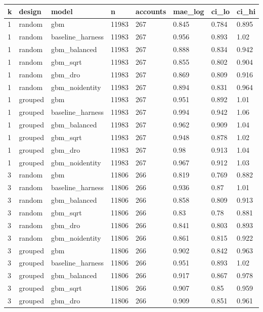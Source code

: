 \begin{tabular}{llllllll}
\toprule
k & design & model & n & accounts & mae\_log & ci\_lo & ci\_hi \\
\midrule
1 & random & gbm & 11983 & 267 & 0.845 & 0.784 & 0.895 \\
1 & random & baseline\_harness & 11983 & 267 & 0.956 & 0.893 & 1.02 \\
1 & random & gbm\_balanced & 11983 & 267 & 0.888 & 0.834 & 0.942 \\
1 & random & gbm\_sqrt & 11983 & 267 & 0.855 & 0.802 & 0.904 \\
1 & random & gbm\_dro & 11983 & 267 & 0.869 & 0.809 & 0.916 \\
1 & random & gbm\_noidentity & 11983 & 267 & 0.894 & 0.831 & 0.964 \\
1 & grouped & gbm & 11983 & 267 & 0.951 & 0.892 & 1.01 \\
1 & grouped & baseline\_harness & 11983 & 267 & 0.994 & 0.942 & 1.06 \\
1 & grouped & gbm\_balanced & 11983 & 267 & 0.962 & 0.909 & 1.04 \\
1 & grouped & gbm\_sqrt & 11983 & 267 & 0.948 & 0.878 & 1.02 \\
1 & grouped & gbm\_dro & 11983 & 267 & 0.98 & 0.913 & 1.04 \\
1 & grouped & gbm\_noidentity & 11983 & 267 & 0.967 & 0.912 & 1.03 \\
3 & random & gbm & 11806 & 266 & 0.819 & 0.769 & 0.882 \\
3 & random & baseline\_harness & 11806 & 266 & 0.936 & 0.87 & 1.01 \\
3 & random & gbm\_balanced & 11806 & 266 & 0.858 & 0.809 & 0.913 \\
3 & random & gbm\_sqrt & 11806 & 266 & 0.83 & 0.78 & 0.881 \\
3 & random & gbm\_dro & 11806 & 266 & 0.841 & 0.803 & 0.893 \\
3 & random & gbm\_noidentity & 11806 & 266 & 0.861 & 0.815 & 0.922 \\
3 & grouped & gbm & 11806 & 266 & 0.902 & 0.842 & 0.963 \\
3 & grouped & baseline\_harness & 11806 & 266 & 0.951 & 0.893 & 1.02 \\
3 & grouped & gbm\_balanced & 11806 & 266 & 0.917 & 0.867 & 0.978 \\
3 & grouped & gbm\_sqrt & 11806 & 266 & 0.907 & 0.85 & 0.959 \\
3 & grouped & gbm\_dro & 11806 & 266 & 0.909 & 0.851 & 0.961 \\

\end{tabular}
